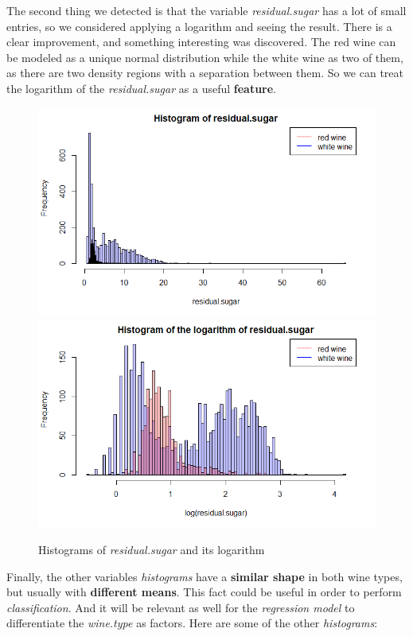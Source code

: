 \documentclass[10pt]{article}
\begin{document}
The second thing we detected is that the variable \textit{residual.sugar} has a lot of small entries, so we considered applying a logarithm and seeing the result. There is a clear improvement, and something interesting was discovered. The red wine can be modeled as a unique normal distribution while the white wine as two of them, as there are two density regions with a separation between them. So we can treat the logarithm of the \textit{residual.sugar} as a useful \textbf{feature}.
\begin{figure}[H]
\centering
\caption{Histograms of \textit{residual.sugar} and its logarithm}
\includegraphics[scale=0.4]{histogram_of_residualsugar}
\includegraphics[scale=0.4]{histogram_of_log_residualsugar}
\end{figure}
Finally, the other variables \textit{histograms} have a \textbf{similar shape} in both wine types, but usually with \textbf{different means}. This fact could be useful in order to perform \textit{classification}. And it will be relevant as well for the \textit{regression model} to differentiate the \textit{wine.type} as factors. Here are some of the other \textit{histograms}:
\end{document}
